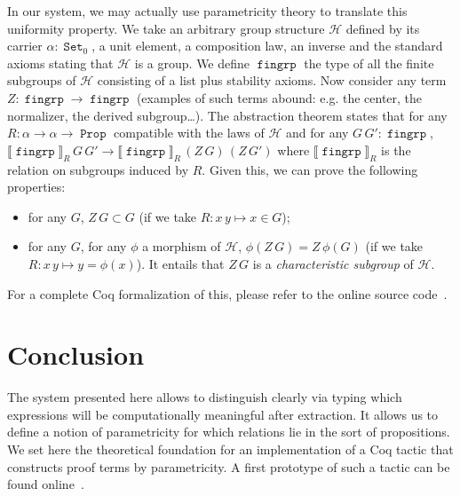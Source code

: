 \documentclass[conference,a4paper]{IEEEtran}
\DeclareMathOperator{\Prop}{\mathtt{Prop}}
\DeclareMathOperator{\Set}{\mathtt{Set}}
\DeclareMathOperator{\fingrp}{\mathtt{fingrp}}
\def\coq{\textsf{Coq}\xspace}
\begin{document}
In our system, we may actually use parametricity theory to translate this
uniformity property. We take an arbitrary group structure
$\mathcal{H}$ defined by its carrier $\alpha : \Set_0$, a unit element, a composition law, an inverse
and the standard axioms stating that
$\mathcal{H}$ is a group. We define $\fingrp$ the type of all the
finite subgroups of $\mathcal{H}$ consisting of a list plus stability axioms.
Now consider any term $Z : \fingrp → \fingrp$ (examples of such terms abound:
e.g. the center, the normalizer, the derived subgroup\dots). The abstraction
theorem states that for any $R : \alpha → \alpha → \Prop$ compatible with the
laws of $\mathcal{H}$ and for any $G\,G' : \fingrp$, $⟦\fingrp⟧_R\,G \,G' →
⟦\fingrp⟧_R\,(Z\,G)\,(Z\,G')$ where $⟦\fingrp⟧_R$ is the relation on subgroups
induced by $R$. Given this, we can prove the following properties:
\begin{itemize} \item for any $G$, $Z\,G \subset G$ (if we take $R : x\,y
\mapsto x \in G$); \item for any $G$, for any $\phi$ a morphism of
$\mathcal{H}$, $\phi(Z\,G) = Z\,\phi(G)$ (if we take $R : x\,y \mapsto y =
\phi(x)$).  It entails that $Z\,G$ is a \emph{characteristic subgroup} of
$\mathcal{H}$.  \end{itemize}

For a complete \coq formalization of this, please refer to the 
online source code~\cite{implem12}.

\section{Conclusion}

The system presented here allows to distinguish clearly via typing which
expressions will be computationally meaningful after extraction. It allows us
to define a notion of parametricity for which relations lie in the sort of
propositions. We set here the theoretical foundation for an implementation of a
\coq tactic that constructs proof terms by parametricity. A first prototype of such
a tactic can be found online~\cite{implem12}.



\end{document}
